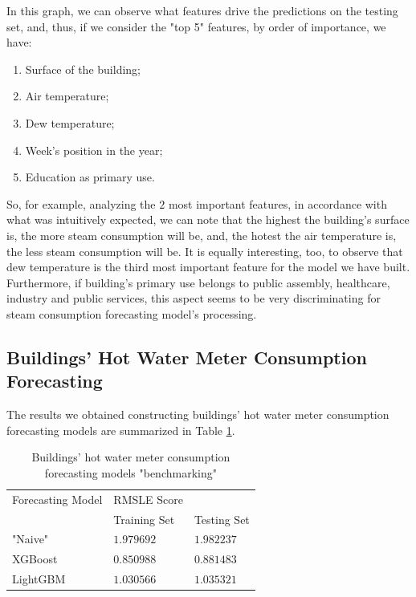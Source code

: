 \documentclass[twocolumn, switch]{article}
\begin{document}
In this graph, we can observe what features drive the predictions on the testing set, and, thus, if we consider the "top 5" features, by order of importance, we have:

\begin{enumerate}
\item Surface of the building;
\item Air temperature;
\item Dew temperature;
\item Week's position in the year;
\item Education as primary use.
\end{enumerate}

So, for example, analyzing the $2$ most important features, in accordance with what was intuitively expected, we can note that the highest the building's surface is, the more steam consumption will be, and, the hotest the air temperature is, the less steam consumption will be. It is equally interesting, too, to observe that dew temperature is the third most important feature for the model we have built. Furthermore, if building's primary use belongs to public assembly, healthcare, industry and public services, this aspect seems to be very discriminating for steam consumption forecasting model's processing.

\subsection{Buildings' Hot Water Meter Consumption Forecasting}

The results we obtained constructing buildings' hot water meter consumption forecasting models are summarized in Table \ref{tab:hot_water_benchmarking}.

\begin{table}[H]
\caption{Buildings' hot water meter consumption forecasting models "benchmarking"}
\centering
\begin{tabular}{lll}
\toprule
Forecasting Model & RMSLE Score & \\
& Training Set & Testing Set \\
\midrule
"Naive" & $1.979692$ & $1.982237$ \\
XGBoost & $0.850988$ & $0.881483$ \\
LightGBM & $1.030566$ & $1.035321$ \\
\bottomrule
\end{tabular}
\label{tab:hot_water_benchmarking}
\end{table}
\end{document}
